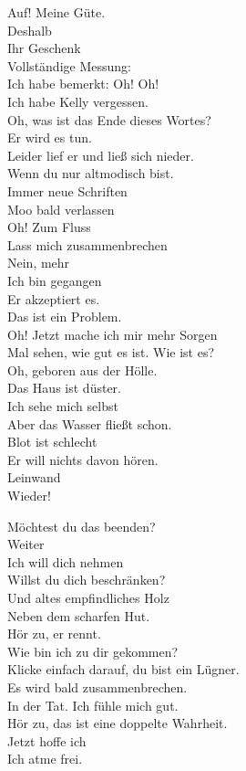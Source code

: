 {		Auf! Meine Güte. \\
		Deshalb \\
		Ihr Geschenk \\
		Vollständige Messung: \\
		Ich habe bemerkt: Oh! Oh! \\
		Ich habe Kelly vergessen. \\
		
		Oh, was ist das Ende dieses Wortes? \\
		Er wird es tun. \\
		Leider lief er und ließ sich nieder. \\
		Wenn du nur altmodisch bist. \\
		Immer neue Schriften \\
		Moo bald verlassen \\
		Oh! Zum Fluss \\
		Lass mich zusammenbrechen \\
		
		Nein, mehr \\
		Ich bin gegangen \\
		Er akzeptiert es.\\
		Das ist ein Problem. \\
		Oh! Jetzt mache ich mir mehr Sorgen \\
		Mal sehen, wie gut es ist. Wie ist es? \\
		
		Oh, geboren aus der Hölle. \\
		Das Haus ist düster. \\
		Ich sehe mich selbst \\
		Aber das Wasser fließt schon. \\
		Blot ist schlecht \\
		Er will nichts davon hören. \\
		Leinwand \\
		Wieder! 
				
		Möchtest du das beenden? \\
		Weiter \\
		Ich will dich nehmen \\
		Willst du dich beschränken? \\
		Und altes empfindliches Holz \\
		Neben dem scharfen Hut. \\
		
		Hör zu, er rennt. \\
		Wie bin ich zu dir gekommen? \\
		Klicke einfach darauf, du bist ein Lügner. \\
		Es wird bald zusammenbrechen. \\
		In der Tat. Ich fühle mich gut. \\
		Hör zu, das ist eine doppelte Wahrheit. \\
		Jetzt hoffe ich \\
		Ich atme frei. \\
		
}

